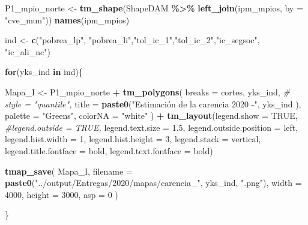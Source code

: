 \documentclass[
  12pt,
]{book}
\newenvironment{Shaded}{\begin{snugshade}}{\end{snugshade}}
\newcommand{\AttributeTok}[1]{\textcolor[rgb]{0.13,0.29,0.53}{#1}}
\newcommand{\CommentTok}[1]{\textcolor[rgb]{0.56,0.35,0.01}{\textit{#1}}}
\newcommand{\ConstantTok}[1]{\textcolor[rgb]{0.56,0.35,0.01}{#1}}
\newcommand{\ControlFlowTok}[1]{\textcolor[rgb]{0.13,0.29,0.53}{\textbf{#1}}}
\newcommand{\DecValTok}[1]{\textcolor[rgb]{0.00,0.00,0.81}{#1}}
\newcommand{\FloatTok}[1]{\textcolor[rgb]{0.00,0.00,0.81}{#1}}
\newcommand{\FunctionTok}[1]{\textcolor[rgb]{0.13,0.29,0.53}{\textbf{#1}}}
\newcommand{\NormalTok}[1]{#1}
\newcommand{\OtherTok}[1]{\textcolor[rgb]{0.56,0.35,0.01}{#1}}
\newcommand{\SpecialCharTok}[1]{\textcolor[rgb]{0.81,0.36,0.00}{\textbf{#1}}}
\newcommand{\StringTok}[1]{\textcolor[rgb]{0.31,0.60,0.02}{#1}}
\begin{document}
\begin{Shaded}
\begin{Highlighting}[]
\NormalTok{P1\_mpio\_norte }\OtherTok{\textless{}{-}}
  \FunctionTok{tm\_shape}\NormalTok{(ShapeDAM }\SpecialCharTok{\%\textgreater{}\%}
             \FunctionTok{left\_join}\NormalTok{(ipm\_mpios,   }\AttributeTok{by =} \StringTok{"cve\_mun"}\NormalTok{))}
\FunctionTok{names}\NormalTok{(ipm\_mpios)}

\NormalTok{ind }\OtherTok{\textless{}{-}} \FunctionTok{c}\NormalTok{(}\StringTok{"pobrea\_lp"}\NormalTok{, }\StringTok{"pobrea\_li"}\NormalTok{,}\StringTok{"tol\_ic\_1"}\NormalTok{,}\StringTok{"tol\_ic\_2"}\NormalTok{,}\StringTok{"ic\_segsoc"}\NormalTok{, }
         \StringTok{"ic\_ali\_nc"}\NormalTok{)}


\ControlFlowTok{for}\NormalTok{(yks\_ind }\ControlFlowTok{in}\NormalTok{ ind)\{}

\NormalTok{  Mapa\_I }\OtherTok{\textless{}{-}}
\NormalTok{    P1\_mpio\_norte }\SpecialCharTok{+} \FunctionTok{tm\_polygons}\NormalTok{(}
      \AttributeTok{breaks  =}\NormalTok{ cortes,}
\NormalTok{      yks\_ind,}
      \CommentTok{\# style = "quantile",}
      \AttributeTok{title =}  \FunctionTok{paste0}\NormalTok{(}\StringTok{"Estimación de la carencia 2020 {-}"}\NormalTok{, yks\_ind ),}
      \AttributeTok{palette =} \StringTok{"Greens"}\NormalTok{,}
      \AttributeTok{colorNA =} \StringTok{"white"}
\NormalTok{    ) }\SpecialCharTok{+} \FunctionTok{tm\_layout}\NormalTok{(}\AttributeTok{legend.show =} \ConstantTok{TRUE}\NormalTok{,}
                  \CommentTok{\#legend.outside = TRUE,}
                  \AttributeTok{legend.text.size =}  \FloatTok{1.5}\NormalTok{, }
                  \AttributeTok{legend.outside.position =} \StringTok{\textquotesingle{}left\textquotesingle{}}\NormalTok{,}
                  \AttributeTok{legend.hist.width =} \DecValTok{1}\NormalTok{,}
                  \AttributeTok{legend.hist.height =} \DecValTok{3}\NormalTok{,}
                  \AttributeTok{legend.stack =} \StringTok{\textquotesingle{}vertical\textquotesingle{}}\NormalTok{,}
                  \AttributeTok{legend.title.fontface =} \StringTok{\textquotesingle{}bold\textquotesingle{}}\NormalTok{,}
                  \AttributeTok{legend.text.fontface =} \StringTok{\textquotesingle{}bold\textquotesingle{}}\NormalTok{) }
  
  
  \FunctionTok{tmap\_save}\NormalTok{(}
\NormalTok{    Mapa\_I,}
    \AttributeTok{filename =}  \FunctionTok{paste0}\NormalTok{(}\StringTok{"../output/Entregas/2020/mapas/carencia\_"}\NormalTok{, yks\_ind, }\StringTok{".png"}\NormalTok{),}
    \AttributeTok{width =} \DecValTok{4000}\NormalTok{,}
    \AttributeTok{height =} \DecValTok{3000}\NormalTok{,}
    \AttributeTok{asp =} \DecValTok{0}
\NormalTok{  )}
  
    
\NormalTok{\}}
\end{Highlighting}
\end{Shaded}
\end{document}

